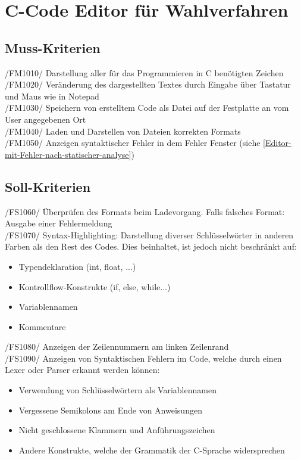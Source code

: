 \documentclass[a4paper]{scrreprt}
\begin{document}
\section{C-Code Editor für Wahlverfahren}
\subsection{Muss-Kriterien}
/FM1010/ Darstellung aller für das Programmieren in C benötigten Zeichen \\
/FM1020/ Veränderung des dargestellten Textes durch Eingabe über Tastatur und Maus wie in Notepad \\
/FM1030/ Speichern von erstelltem Code als Datei auf der Festplatte an vom User angegebenen Ort \\
/FM1040/ Laden und Darstellen von Dateien korrekten Formats \\
/FM1050/ Anzeigen syntaktischer Fehler in dem Fehler Fenster (siehe \ref{Editor-mit-Fehler-nach-statischer-analyse})

\subsection{Soll-Kriterien}
/FS1060/ Überprüfen des Formats beim Ladevorgang. Falls falsches Format: Ausgabe einer Fehlermeldung \\
/FS1070/ Syntax-Highlighting: Darstellung diverser Schlüsselwörter in anderen Farben als den Rest des Codes. Dies beinhaltet, ist jedoch nicht beschränkt auf: 
\begin{itemize}
\item Typendeklaration (int, float, ...)
\item Kontrollflow-Konstrukte (if, else, while...)
\item Variablennamen
\item Kommentare
\end{itemize}
/FS1080/ Anzeigen der Zeilennummern am linken Zeilenrand \\
/FS1090/ Anzeigen von Syntaktischen Fehlern im Code, welche durch einen Lexer oder Parser erkannt werden können: 
\begin{itemize}
\item Verwendung von Schlüsselwörtern als Variablennamen 
\item Vergessene Semikolons am Ende von Anweisungen
\item Nicht geschlossene Klammern und Anführungszeichen
\item Andere Konstrukte, welche der Grammatik der C-Sprache widersprechen
\end{itemize}
\end{document}
